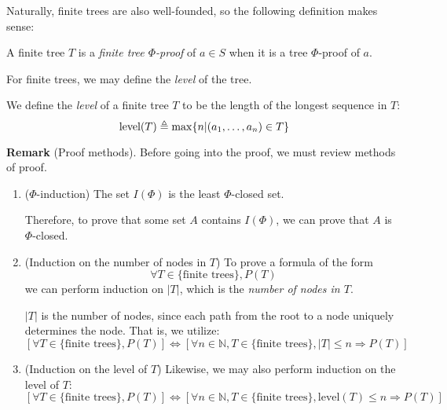 \documentclass[12pt]{article}
\begin{document}
Naturally, finite trees are also well-founded, so the following definition makes sense:
\begin{definition}
	A finite tree $T$ is a \emph{finite tree $\Phi$-proof} of $a\in S$ when it is a tree $\Phi$-proof of $a$.
\end{definition}

For finite trees, we may define the \emph{level} of the tree.
\begin{definition}
	We define the \emph{level} of a finite tree $T$ to be the length of the longest sequence in $T$:
	\[\text{level}(T)\triangleq\max\{n|(a_1,\dots,a_n)\in T\}\]
\end{definition}

\noindent\textbf{Remark }(Proof methods).
Before going into the proof, we must review methods of proof.
\begin{enumerate}
	\item($\Phi$-induction)
	      The set $I(\Phi)$ is the least $\Phi$-closed set.

	      Therefore, to prove that some set $A$ contains $I(\Phi)$, we can prove that $A$ is $\Phi$-closed.
	\item(Induction on the number of nodes in $T$)
	      To prove a formula of the form
	      \[\forall T\in\{\text{finite trees}\}, P(T)\]
	      we can perform induction on $|T|$, which is the \emph{number of nodes in $T$}.

	      $|T|$ is the number of nodes, since each path from the root to a node uniquely determines the node.
	      That is, we utilize:
	      \[
		      [\forall T\in\{\text{finite trees}\},P(T)]
		      \Leftrightarrow
		      [\forall n\in\mathbb{N},T\in\{\text{finite trees}\},|T|\le n\Rightarrow P(T)]
	      \]
	\item(Induction on the level of $T$)
	      Likewise, we may also perform induction on the level of $T$:
	      \[
		      [\forall T\in\{\text{finite trees}\},P(T)]
		      \Leftrightarrow
		      [\forall n\in\mathbb{N},T\in\{\text{finite trees}\},\text{level}(T)\le n\Rightarrow P(T)]
	      \]
\end{enumerate}
\end{document}
